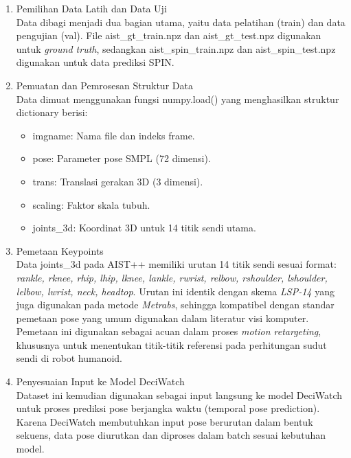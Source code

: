 \begin{enumerate}
    \item {Pemilihan Data Latih dan Data Uji} \\
    Data dibagi menjadi dua bagian utama, yaitu data pelatihan (train) dan data pengujian (val). File {aist\_gt\_train.npz} dan {aist\_gt\_test.npz} digunakan untuk \textit{ground truth}, sedangkan {aist\_spin\_train.npz} dan {aist\_spin\_test.npz} digunakan untuk data prediksi SPIN.
    
    \item {Pemuatan dan Pemrosesan Struktur Data} \\
    Data dimuat menggunakan fungsi {numpy.load()} yang menghasilkan struktur dictionary berisi:
    \begin{itemize}
        \item {imgname}: Nama file dan indeks frame.
        \item {pose}: Parameter pose SMPL (72 dimensi).
        \item {trans}: Translasi gerakan 3D (3 dimensi).
        \item {scaling}: Faktor skala tubuh.
        \item {joints\_3d}: Koordinat 3D untuk 14 titik sendi utama.
    \end{itemize}
    
    \item {Pemetaan Keypoints} \\
    Data {joints\_3d} pada AIST++ memiliki urutan 14 titik sendi sesuai format: \textit{rankle, rknee, rhip, lhip, lknee, lankle, rwrist, relbow, rshoulder, lshoulder, lelbow, lwrist, neck, headtop}. Urutan ini identik dengan skema \textit{LSP-14} yang juga digunakan pada metode \textit{Metrabs}, sehingga kompatibel dengan standar pemetaan pose yang umum digunakan dalam literatur visi komputer. Pemetaan ini digunakan sebagai acuan dalam proses \textit{motion retargeting}, khususnya untuk menentukan titik-titik referensi pada perhitungan sudut sendi di robot humanoid.

    
    \item {Penyesuaian Input ke Model DeciWatch} \\
    Dataset ini kemudian digunakan sebagai input langsung ke model DeciWatch untuk proses prediksi pose berjangka waktu (temporal pose prediction). Karena DeciWatch membutuhkan input pose berurutan dalam bentuk sekuens, data pose diurutkan dan diproses dalam batch sesuai kebutuhan model.

\end{enumerate}

